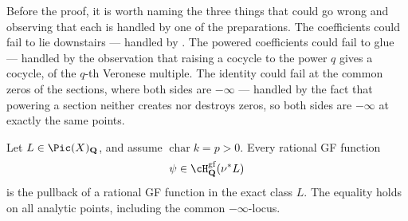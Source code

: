 Before the proof, it is worth naming the three things that could go wrong
and observing that each is handled by one of the preparations.  The
coefficients could fail to lie downstairs --- handled by
.  The powered coefficients could fail
to glue --- handled by the observation that raising a cocycle to the power
$q$ gives a cocycle, of the $q$-th Veronese multiple.  The identity could
fail at the common zeros of the sections, where both sides are $-\infty$
--- handled by the fact that powering a section neither creates nor destroys
zeros, so both sides are $-\infty$ at exactly the same points.

\begin{proposition}\label{prop:bj-frobenius-gf-descent}
Let $L\in\Pic(X)_{\mathbf Q}$, and assume
$\operatorname{char}k=p>0$.
Every rational GF function
\[
                         \psi\in
              \cH^{\mathrm{gf}}_{\mathbf Q}(\nu^*L)
\]
is the pullback of a rational GF function in the exact class $L$.
The equality holds on all analytic points, including the common
$-\infty$-locus.
\end{proposition}

